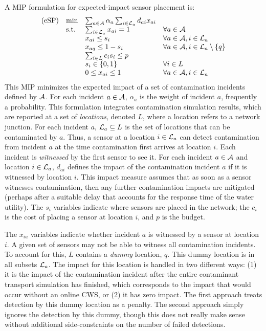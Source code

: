 A MIP formulation for expected-\/impact sensor placement is: \[ \label{eqn:SP} \begin{array}{llll} {\rm (eSP)} & \min & \sum_{a \in {\cal A}} \alpha_a \sum_{i \in {\cal L}_a} d_{ai} x_{ai} &\\ & {\rm s.t.} & \sum_{i\in {\cal L}_a} x_{ai} = 1 & \forall a \in {\cal A}\\ & & x_{ai} \le s_i & \forall a \in {\cal A}, i \in {\cal L}_a\\ & & x_{aq} \leq 1-s_i & \forall a \in {\cal A}, i \in {\cal L}_a \setminus \{q\}\\ & & \sum_{i \in L} c_i s_i \le p&\\ & & s_i \in \{0,1\} & \forall i \in L\\ & & 0 \leq x_{ai} \leq 1 & \forall a \in {\cal A}, i \in {\cal L}_a \end{array} \] This MIP minimizes the expected impact of a set of contamination incidents defined by ${\cal A}$. For each incident $a \in {\cal A}$, $\alpha_a$ is the weight of incident $a$, frequently a probability. This formulation integrates contamination simulation results, which are reported at a set of {\itshape locations\/}, denoted $L$, where a location refers to a network junction. For each incident $a$, ${\cal L}_a \subseteq L$ is the set of locations that can be contaminated by $a$. Thus, a sensor at a location $i \in {\cal L}_a$ can detect contamination from incident $a$ at the time contamination first arrives at location $i$. Each incident is {\itshape witnessed\/} by the first sensor to see it. For each incident $a \in {\cal A}$ and location $i \in {\cal L}_a$, $d_{ai}$ defines the impact of the contamination incident $a$ if it is witnessed by location $i$. This impact measure assumes that as soon as a sensor witnesses contamination, then any further contamination impacts are mitigated (perhaps after a suitable delay that accounts for the response time of the water utility). The $s_i$ variables indicate where sensors are placed in the network; the $c_i$ is the cost of placing a sensor at location $i$, and $p$ is the budget.

The $x_{ia}$ variables indicate whether incident $a$ is witnessed by a sensor at location $i$. A given set of sensors may not be able to witness all contamination incidents. To account for this, $L$ contains a {\itshape dummy\/} location, $q$. This dummy location is in all subsets ${\cal L}_a$. The impact for this location is handled in two different ways: (1) it is the impact of the contamination incident after the entire contaminant transport simulation has finished, which corresponds to the impact that would occur without an online CWS, or (2) it has zero impact. The first approach treats detection by this dummy location as a penalty. The second approach simply ignores the detection by this dummy, though this does not really make sense without additional side-\/constraints on the number of failed detections.

